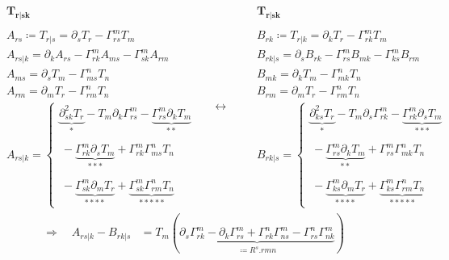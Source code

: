 \begin{equation}
  \begin{split}
  \ & \boldsymbol{T_{r|sk}}\\\\
  \ & A_{rs} \coloneqq T_{r|s} = \partial_{s}T_r - \Gamma^m_{rs}T_m\\
  \ & A_{rs|k}= \partial_k A_{rs} - \Gamma^m_{rk}A_{ms} -  \Gamma^m_{sk}A_{rm}\\
  \ & A_{ms}=  \partial_{s}T_m - \Gamma^n_{ms}T_n\\
  \ & A_{rm} = \partial_{m}T_r - \Gamma^n_{rm}T_n\\
  \ & A_{rs|k}= \left \{\begin{array}{l}
   \underbrace{\partial^2_{sk}T_r}_{*} - T_m\partial_{k}\Gamma^m_{rs} - \underbrace{\Gamma^m_{rs}\partial_{k}T_m}_{**} \\\\
   \ -\underbrace{\Gamma^m_{rk}\partial_{s}T_m}_{***} +\Gamma^m_{rk} \Gamma^n_{ms}T_n \\\\
   \ - \underbrace{\Gamma^m_{sk}\partial_{m}T_r}_{****} +\underbrace{\Gamma^m_{sk} \Gamma^n_{rm}T_n}_{*****}
  \end{array}\right.
  \end{split}
\quad\leftrightarrow\quad
  \begin{split}
 \ & \boldsymbol{T_{r|sk}}\\\\
  \ & B_{rk} \coloneqq T_{r|k} = \partial_{k}T_r - \Gamma^m_{rk}T_m\\
  \ & B_{rk|s}= \partial_s B_{rk} - \Gamma^m_{rs}B_{mk} -  \Gamma^m_{ks}B_{rm}\\
  \ & B_{mk}=  \partial_{k}T_m - \Gamma^n_{mk}T_n\\
  \ & B_{rm}=  \partial_{m}T_r - \Gamma^n_{rm}T_n\\
  \ & B_{rk|s}= \left \{\begin{array}{l}
  \underbrace{\partial^2_{ks}T_r}_{*} - T_m\partial_{s}\Gamma^m_{rk} - \underbrace{\Gamma^m_{rk}\partial_{s}T_m}_{***} \\\\
   \ -\underbrace{\Gamma^m_{rs}\partial_{k}T_m}_{**} +\Gamma^m_{rs} \Gamma^n_{mk}T_n \\\\
   \ - \underbrace{\Gamma^m_{ks}\partial_{m}T_r}_{****} +\underbrace{\Gamma^m_{ks} \Gamma^n_{rm}T_n}_{*****}
  \end{array}\right.
  \end{split}
\end{equation}\begin{align}
\Rightarrow\quad A_{rs|k} - B_{rk|s} &= T_m\left( \underbrace{\partial_{s}\Gamma^m_{rk}-\partial_{k}\Gamma^m_{rs}+\Gamma^n_{rk} \Gamma^m_{ns}- \Gamma^n_{rs} \Gamma^m_{nk} }_{\coloneqq R^s{.rmn}}\right) 
\end{align}
